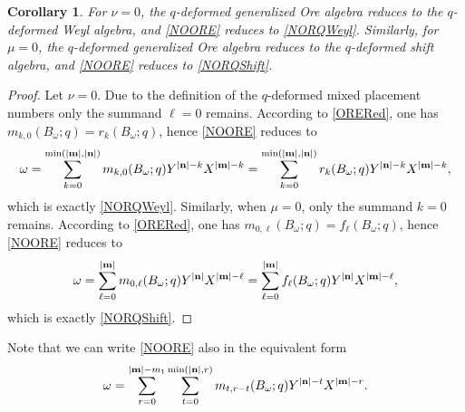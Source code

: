 \documentclass[10pt]{amsart}
\newtheorem{corollary}[theorem]{Corollary}
\begin{document}
\begin{corollary} For $\nu=0$, the $q$-deformed generalized Ore algebra reduces to the  $q$-deformed Weyl algebra, and \eqref{NOORE} reduces to \eqref{NORQWeyl}. Similarly, for $\mu=0$, the  $q$-deformed generalized Ore algebra reduces to the  $q$-deformed shift algebra, and \eqref{NOORE} reduces to \eqref{NORQShift}.
\end{corollary}
\begin{proof}
Let $\nu=0$. Due to the definition of the $q$-deformed mixed placement numbers only the summand $\ell=0$ remains. According to \eqref{ORERed}, one has $m_{k,0}(B_{\omega};q)=r_{k}(B_{\omega};q)$, hence \eqref{NOORE} reduces to
$$
\omega = \sum_{k=0}^{\min (|{\bf m}|,|{\bf n}|)}  m_{k,0}(B_{\omega};q) Y^{|{\bf n}|-k} X^{|{\bf m}|-k}=\sum_{k=0}^{\min (|{\bf m}|,|{\bf n}|)} r_{k}(B_{\omega};q) Y^{|{\bf n}|-k} X^{|{\bf m}|-k},
$$
which is exactly \eqref{NORQWeyl}. Similarly, when $\mu=0$, only the summand $k=0$ remains. According to \eqref{ORERed}, one has $m_{0,\ell}(B_{\omega};q)=f_{\ell}(B_{\omega};q)$, hence \eqref{NOORE} reduces to
$$
\omega = \sum_{\ell=0}^{|{\bf m}|}  m_{0,\ell}(B_{\omega};q) Y^{|{\bf n}|} X^{|{\bf m}|-\ell}=\sum_{\ell=0}^{|{\bf m}|} f_{\ell }(B_{\omega};q) Y^{|{\bf n}|} X^{|{\bf m}|-\ell},
$$
which is exactly \eqref{NORQShift}.
\end{proof}
Note that we can write \eqref{NOORE} also in the equivalent form
\begin{equation}\label{NOORE2}
\omega = \sum_{r=0}^{|{\bf m}|-m_1}\sum_{t=0}^{\min(|{\bf n}|, r)} m_{t,r-t}(B_{\omega};q) Y^{|{\bf n}|-t}X^{|{\bf m}|-r}.
\end{equation}
\end{document}
